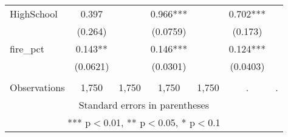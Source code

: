 \begin{tabular}{lcccccc}
HighSchool & 0.397 &  & 0.966*** &  & 0.702*** &  \\
 & (0.264) &  & (0.0759) &  & (0.173) &  \\
fire\_pct & 0.143** &  & 0.146*** &  & 0.124*** &  \\
 & (0.0621) &  & (0.0301) &  & (0.0403) &  \\
 &  &  &  &  &  &  \\
 Observations & 1,750 & 1,750 & 1,750 & 1,750 & . & . \\ \hline
\multicolumn{7}{c}{ Standard errors in parentheses} \\
\multicolumn{7}{c}{ *** p$<$0.01, ** p$<$0.05, * p$<$0.1} \\
\end{tabular}
